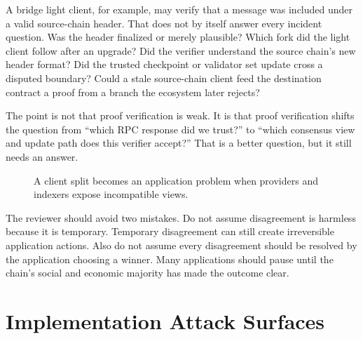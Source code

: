 A bridge light client, for example, may verify that a message was included under a valid source-chain header. That does not by itself answer every incident question. Was the header finalized or merely plausible? Which fork did the light client follow after an upgrade? Did the verifier understand the source chain's new header format? Did the trusted checkpoint or validator set update cross a disputed boundary? Could a stale source-chain client feed the destination contract a proof from a branch the ecosystem later rejects?

The point is not that proof verification is weak. It is that proof verification shifts the question from ``which RPC response did we trust?'' to ``which consensus view and update path does this verifier accept?'' That is a better question, but it still needs an answer.

\begin{figure}[htbp]
\centering
{}
\caption{A client split becomes an application problem when providers and indexers expose incompatible views.}
\end{figure}

The reviewer should avoid two mistakes. Do not assume disagreement is harmless because it is temporary. Temporary disagreement can still create irreversible application actions. Also do not assume every disagreement should be resolved by the application choosing a winner. Many applications should pause until the chain's social and economic majority has made the outcome clear.

\section{Implementation Attack Surfaces}


